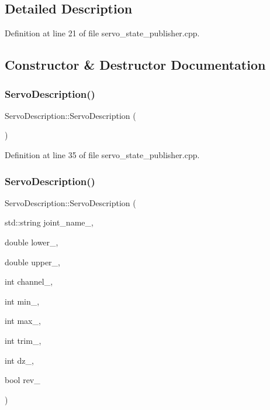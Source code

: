 \subsection{Detailed Description}


Definition at line 21 of file servo\+\_\+state\+\_\+publisher.\+cpp.



\subsection{Constructor \& Destructor Documentation}
\mbox{\label{classServoDescription_ade48340af8bb04123e9f7e74749ad75e}} 
\subsubsection{\texorpdfstring{ServoDescription()}{ServoDescription()}\hspace{0.1cm}{\footnotesize\ttfamily [1/2]}}
{\footnotesize\ttfamily Servo\+Description\+::\+Servo\+Description (\begin{DoxyParamCaption}{ }\end{DoxyParamCaption})\hspace{0.3cm}{\ttfamily [inline]}}



Definition at line 35 of file servo\+\_\+state\+\_\+publisher.\+cpp.

\mbox{\label{classServoDescription_aeb5d29abe6875a60140c5e27e5e3f419}} 
\subsubsection{\texorpdfstring{ServoDescription()}{ServoDescription()}\hspace{0.1cm}{\footnotesize\ttfamily [2/2]}}
{\footnotesize\ttfamily Servo\+Description\+::\+Servo\+Description (\begin{DoxyParamCaption}\item[{std\+::string}]{joint\+\_\+name\+\_\+,  }\item[{double}]{lower\+\_\+,  }\item[{double}]{upper\+\_\+,  }\item[{int}]{channel\+\_\+,  }\item[{int}]{min\+\_\+,  }\item[{int}]{max\+\_\+,  }\item[{int}]{trim\+\_\+,  }\item[{int}]{dz\+\_\+,  }\item[{bool}]{rev\+\_\+ }\end{DoxyParamCaption})\hspace{0.3cm}{\ttfamily [inline]}}



